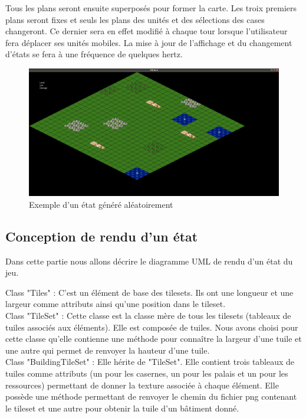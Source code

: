 \documentclass[12pt,a4paper]{article}
\begin{document}
Tous les plans seront ensuite superposés pour former la carte. Les troix premiers plans seront fixes et seuls les plans des unités et des sélections des cases changeront. Ce dernier sera en effet modifié à chaque tour lorsque l'utilisateur fera déplacer ses unités mobiles. La mise à jour de l'affichage et du changement d'états se fera à une fréquence de quelques hertz.

\newpage

\begin{figure}[!ht]
\centering
    \includegraphics[width=1\textwidth]{ressources/MapAlea.png}
     \caption{Exemple d'un état généré aléatoirement}
\end{figure}

\subsection{Conception de rendu d'un état}
Dans cette partie nous allons décrire le diagramme UML de rendu d'un état du jeu.

Class "Tiles" : C'est un élément de base des tilesets. Ils ont une longueur et une largeur comme attributs ainsi qu'une position dans le tileset.\\

Class "TileSet" : Cette classe est la classe mère de tous les tilesets (tableaux de tuiles associés aux éléments). Elle est composée de tuiles. Nous avons choisi pour cette classe qu'elle contienne une méthode pour connaître la largeur d'une tuile et une autre qui permet de renvoyer la hauteur d'une tuile.\\

Class "BuildingTileSet" :  Elle hérite de "TileSet". Elle contient trois tableaux de tuiles comme attributs (un pour les casernes, un pour les palais et un pour les ressources) permettant de donner la texture associée à chaque élément. Elle possède une méthode permettant de renvoyer le chemin du fichier png contenant le tileset et une autre pour obtenir la tuile d'un bâtiment donné. \\
\end{document}
